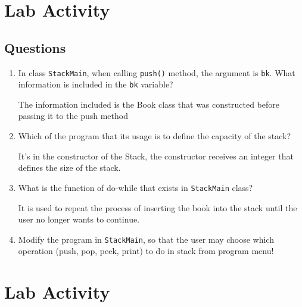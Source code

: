 \documentclass[12pt,titlepage]{article}
\begin{document}
\section{Lab Activity}
\subsection{Questions}
\begin{enumerate}
    \item {
        In class \texttt{StackMain}, when calling \texttt{push()} method, the argument is \texttt{bk}.
        What information is included in the \texttt{bk} variable?

        The information included is the Book class that was constructed before passing it to the push method
    }
    \item {
        Which of the program that its usage is to define the capacity of the stack?

        It's in the constructor of the Stack, the constructor receives an integer that defines the size of the stack.
    }
    \item {
        What is the function of do-while that exists in \texttt{StackMain} class?

        It is used to repeat the process of inserting the book into the stack until the user no longer wants to continue.
    }
    \item {
        Modify the program in \texttt{StackMain}, so that the user may choose which operation (push, pop, peek, print) to do in stack from program menu!
    }
\end{enumerate}

\section{Lab Activity}
\end{document}

